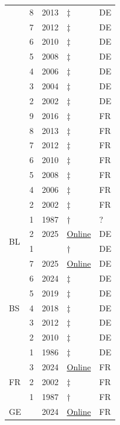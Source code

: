 {\begin{minipage}[t]{0.49\textwidth}
\begin{longtable}{|p{1cm}|p{1cm}|p{1.5cm}|p{1.5cm}|p{1cm}|}
 & 8 & 2013 & ‡ & DE \\
 & 7 & 2012 & ‡ & DE \\
 & 6 & 2010 & ‡ & DE \\
 & 5 & 2008 & ‡ & DE \\
 & 4 & 2006 & ‡ & DE \\
 & 3 & 2004 & ‡ & DE \\
 & 2 & 2002 & ‡ & DE \\

 & 9 & 2016 & ‡ & FR \\
 & 8 & 2013 & ‡ & FR \\
 & 7 & 2012 & ‡ & FR \\
 & 6 & 2010 & ‡ & FR \\
 & 5 & 2008 & ‡ & FR \\
 & 4 & 2006 & ‡ & FR \\
 & 2 & 2002 & ‡ & FR \\

 & 1 & 1987 & † & ? \\ \hline

\multirow{2}{*}{BL} & 2 & 2025 & \href{https://bl-api.webcloud7.ch/politik-und-behorden/direktionen/bau-und-umweltschutzdirektion/raumplanung/raumplanung/richtplanung/downloads-richtplanung/objektblatter.pdf}{Online} & DE \\
 & 1 &  & † & DE \\ \hline

\multirow{7}{*}{BS} & 7 & 2025 & \href{https://www.bs.ch/bvd/staedtebau-architektur/raumplanung/kantonaler-richtplan}{Online} & DE \\
 & 6 & 2024 & ‡ & DE \\
 & 5 & 2019 & ‡ & DE \\
 & 4 & 2018 & ‡ & DE \\
 & 3 & 2012 & ‡ & DE \\
 & 2 & 2010 & ‡ & DE \\
 & 1 & 1986 & ‡ & DE \\ \hline

\multirow{3}{*}{FR} & 3 & 2024 & \href{https://geo.fr.ch/PDCantC/}{Online} & FR \\
 & 2 & 2002 & ‡ & FR \\
 & 1 & 1987 & † & FR \\ \hline

\multirow{1}{*}{GE} &  & 2024 & \href{https://www.ge.ch/dossier/amenager-territoire/planification-cantonale-regionale/plan-directeur-cantonal-2030}{Online} & FR \\ \hline


\end{longtable}
\end{minipage}}
